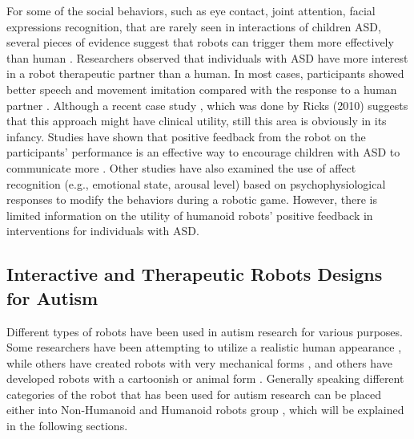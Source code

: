 For some of the social behaviors, such as eye contact, joint attention, facial expressions 
recognition, that are rarely seen in interactions of children ASD, several pieces of evidence suggest that 
robots can trigger them more effectively than human \cite{dautenhahn2000issues}. Researchers observed that individuals 
with ASD have more interest in a robot therapeutic partner than a human. In most cases, participants 
showed better speech and movement imitation compared with the response to a human partner \cite{werry2001investigating}. Although a 
recent case study \cite{ricks2010trends}, which was done by Ricks (2010) suggests that this approach might have clinical 
utility, still this area is obviously in its infancy. Studies have shown that positive feedback from 
the robot on the participants’ performance is an effective way to encourage children with ASD to 
communicate more \cite{ricks2010trends}. Other studies have also examined the use of affect recognition (e.g., emotional 
state, arousal level) based on psychophysiological responses to modify the behaviors during a robotic 
game. However, there is limited information on the utility of humanoid robots’ positive feedback in 
interventions for individuals with ASD.

\subsection{Interactive and Therapeutic Robots Designs for Autism}
Different types of robots have been used in autism research for various purposes. Some researchers 
have been attempting to utilize a realistic human appearance \cite{robins2005robotic}, while others have 
created robots with very mechanical forms \cite{dautenhahn2004towards}, and others have developed robots 
with a cartoonish or animal form \cite{kozima2005interactive}. Generally speaking different categories of 
the robot that has been used for autism research can be placed either into Non-Humanoid and Humanoid robots 
group \cite{ricks2010trends}, which will be explained in the following sections.

